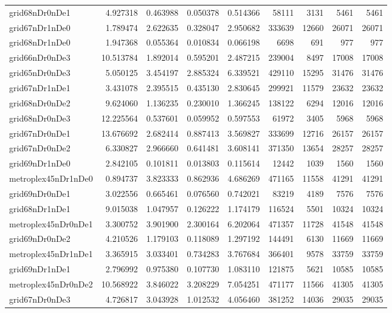 \documentclass[../../../thesis.tex]{subfiles}
\begin{document}
\begin{longtable}{|l|r|r|r|r|r|r|r|r|}
grid68nDr0nDe1 & 4.927318 & 0.463988 & 0.050378 & 0.514366 & 58111 & 3131 & 5461 & 5461 \\
grid67nDr1nDe0 & 1.789474 & 2.622635 & 0.328047 & 2.950682 & 333639 & 12660 & 26071 & 26071 \\
grid68nDr1nDe0 & 1.947368 & 0.055364 & 0.010834 & 0.066198 & 6698 & 691 & 977 & 977 \\
grid66nDr0nDe3 & 10.513784 & 1.892014 & 0.595201 & 2.487215 & 239004 & 8497 & 17008 & 17008 \\
grid65nDr0nDe3 & 5.050125 & 3.454197 & 2.885324 & 6.339521 & 429110 & 15295 & 31476 & 31476 \\
grid67nDr1nDe1 & 3.431078 & 2.395515 & 0.435130 & 2.830645 & 299921 & 11579 & 23632 & 23632 \\
grid68nDr0nDe2 & 9.624060 & 1.136235 & 0.230010 & 1.366245 & 138122 & 6294 & 12016 & 12016 \\
grid68nDr0nDe3 & 12.225564 & 0.537601 & 0.059952 & 0.597553 & 61972 & 3405 & 5968 & 5968 \\
grid67nDr0nDe1 & 13.676692 & 2.682414 & 0.887413 & 3.569827 & 333699 & 12716 & 26157 & 26157 \\
grid67nDr0nDe2 & 6.330827 & 2.966660 & 0.641481 & 3.608141 & 371350 & 13654 & 28257 & 28257 \\
grid69nDr1nDe0 & 2.842105 & 0.101811 & 0.013803 & 0.115614 & 12442 & 1039 & 1560 & 1560 \\
metroplex45nDr1nDe0 & 0.894737 & 3.823333 & 0.862936 & 4.686269 & 471165 & 11558 & 41291 & 41291 \\
grid69nDr0nDe1 & 3.022556 & 0.665461 & 0.076560 & 0.742021 & 83219 & 4189 & 7576 & 7576 \\
grid68nDr1nDe1 & 9.015038 & 1.047957 & 0.126222 & 1.174179 & 116524 & 5501 & 10324 & 10324 \\
metroplex45nDr0nDe1 & 3.300752 & 3.901900 & 2.300164 & 6.202064 & 471357 & 11728 & 41548 & 41548 \\
grid69nDr0nDe2 & 4.210526 & 1.179103 & 0.118089 & 1.297192 & 144491 & 6130 & 11669 & 11669 \\
metroplex45nDr1nDe1 & 3.365915 & 3.033401 & 0.734283 & 3.767684 & 366401 & 9578 & 33759 & 33759 \\
grid69nDr1nDe1 & 2.796992 & 0.975380 & 0.107730 & 1.083110 & 121875 & 5621 & 10585 & 10585 \\
metroplex45nDr0nDe2 & 10.568922 & 3.846022 & 3.208229 & 7.054251 & 471177 & 11566 & 41305 & 41305 \\
grid67nDr0nDe3 & 4.726817 & 3.043928 & 1.012532 & 4.056460 & 381252 & 14036 & 29035 & 29035 \\

\end{longtable}
\end{document}
